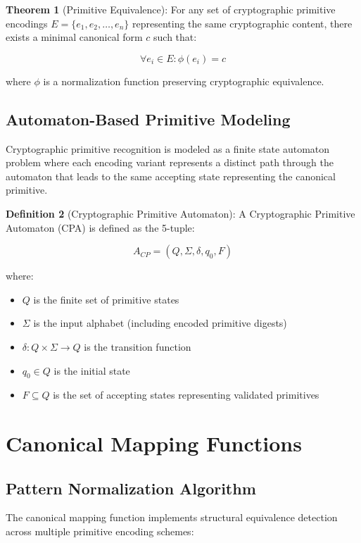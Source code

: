 \documentclass[11pt,a4paper]{article}
\begin{document}
\textbf{Theorem 1} (Primitive Equivalence): For any set of cryptographic primitive encodings $E = \{e_1, e_2, \ldots, e_n\}$ representing the same cryptographic content, there exists a minimal canonical form $c$ such that:

$$\forall e_i \in E : \phi(e_i) = c$$

where $\phi$ is a normalization function preserving cryptographic equivalence.

\subsection{Automaton-Based Primitive Modeling}

Cryptographic primitive recognition is modeled as a finite state automaton problem where each encoding variant represents a distinct path through the automaton that leads to the same accepting state representing the canonical primitive.

\textbf{Definition 2} (Cryptographic Primitive Automaton): A Cryptographic Primitive Automaton (CPA) is defined as the 5-tuple:

$$A_{CP} = (Q, \Sigma, \delta, q_0, F)$$

where:
\begin{itemize}
    \item $Q$ is the finite set of primitive states
    \item $\Sigma$ is the input alphabet (including encoded primitive digests)
    \item $\delta : Q \times \Sigma \rightarrow Q$ is the transition function
    \item $q_0 \in Q$ is the initial state
    \item $F \subseteq Q$ is the set of accepting states representing validated primitives
\end{itemize}

\section{Canonical Mapping Functions}

\subsection{Pattern Normalization Algorithm}

The canonical mapping function implements structural equivalence detection across multiple primitive encoding schemes:
\end{document}
